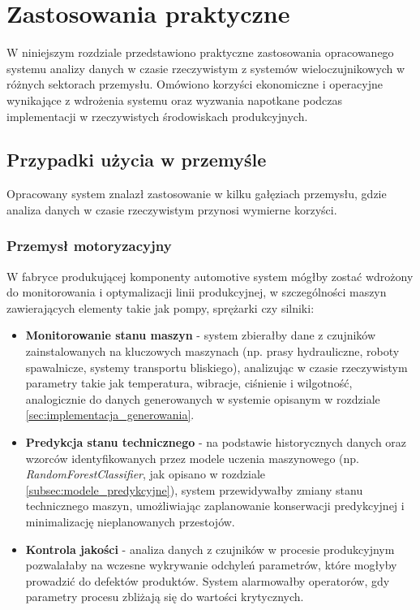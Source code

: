 \section{Zastosowania praktyczne}
\label{sec:zastosowania_praktyczne}

W niniejszym rozdziale przedstawiono praktyczne zastosowania opracowanego systemu analizy danych w czasie rzeczywistym z
systemów wieloczujnikowych w różnych sektorach przemysłu. Omówiono korzyści ekonomiczne i operacyjne wynikające z wdrożenia systemu
oraz wyzwania napotkane podczas implementacji w rzeczywistych środowiskach produkcyjnych.

\subsection{Przypadki użycia w przemyśle}
\label{subsec:przypadki_uzycia}

Opracowany system znalazł zastosowanie w kilku gałęziach przemysłu, gdzie analiza danych w czasie rzeczywistym przynosi wymierne korzyści.

\subsubsection{Przemysł motoryzacyjny}
\label{subsubsec:przemysl_motoryzacyjny}

W fabryce produkującej komponenty automotive system mógłby zostać wdrożony do monitorowania i optymalizacji linii produkcyjnej, w szczególności maszyn zawierających elementy takie jak pompy, sprężarki czy silniki:

\begin{itemize}
    \item \textbf{Monitorowanie stanu maszyn} - system zbierałby dane z czujników zainstalowanych na kluczowych maszynach (np. prasy hydrauliczne, roboty spawalnicze, systemy transportu bliskiego),
    analizując w czasie rzeczywistym parametry takie jak temperatura, wibracje, ciśnienie i wilgotność, analogicznie do danych generowanych w systemie opisanym w rozdziale \ref{sec:implementacja_generowania}.
    \item \textbf{Predykcja stanu technicznego} - na podstawie historycznych danych oraz wzorców identyfikowanych przez modele uczenia maszynowego (np. \textit{RandomForestClassifier}, jak opisano w rozdziale \ref{subsec:modele_predykcyjne}), system przewidywałby zmiany stanu technicznego maszyn,
    umożliwiając zaplanowanie konserwacji predykcyjnej i minimalizację nieplanowanych przestojów.
    \item \textbf{Kontrola jakości} - analiza danych z czujników w procesie produkcyjnym pozwalałaby na wczesne wykrywanie odchyleń parametrów, które mogłyby prowadzić do defektów
    produktów. System alarmowałby operatorów, gdy parametry procesu zbliżają się do wartości krytycznych.
\end{itemize}

